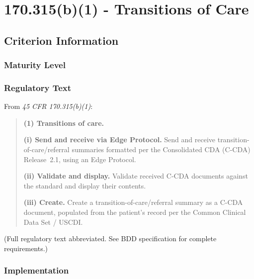 


\chapter{\textsection{} 170.315(b)(1) - Transitions of Care}
\label{chap:b1}


\section{Criterion Information}

\subsection{Maturity Level}

\subsection{Regulatory Text}

From \textit{45 CFR \textsection{} 170.315(b)(1)}:

\begin{quotation}
\textbf{(1) Transitions of care.}

\textbf{(i) Send and receive via Edge Protocol.} Send and receive transition-of-care/referral summaries formatted per the Consolidated CDA (C-CDA) Release~2.1, using an Edge Protocol.

\textbf{(ii) Validate and display.} Validate received C-CDA documents against the standard and display their contents.

\textbf{(iii) Create.} Create a transition-of-care/referral summary as a C-CDA document, populated from the patient's record per the Common Clinical Data Set / USCDI.
\end{quotation}

(Full regulatory text abbreviated. See BDD specification for complete requirements.)

\subsection{Implementation}

